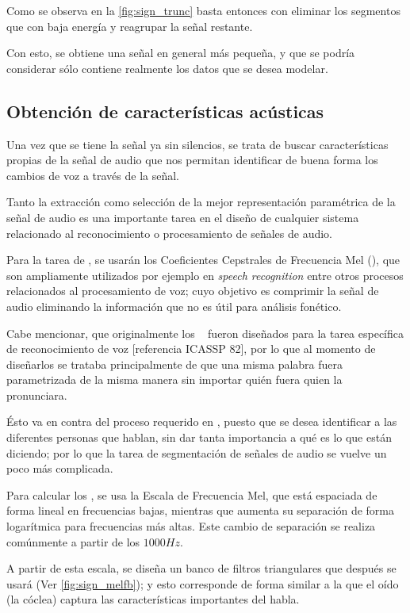 Como se observa en la \autoref{fig:sign_trunc} basta entonces con eliminar los segmentos que con baja energía y reagrupar la señal restante.

Con esto, se obtiene una señal en general más pequeña, y que se podría  considerar sólo contiene realmente los datos que se desea modelar.

\subsection{Obtención de características acústicas}

Una vez que se tiene la señal ya sin silencios, se trata de buscar características propias de la señal de audio que nos permitan identificar de buena forma los cambios de voz a través de la señal.

Tanto la extracción como selección de la mejor representación paramétrica de la señal de audio es una importante tarea en el diseño de cualquier sistema relacionado al reconocimiento o procesamiento de señales de audio. 

Para la tarea de \sd, se usarán los Coeficientes Cepstrales de Frecuencia Mel  (\MFCC), que son ampliamente utilizados por ejemplo en \textit{speech recognition} entre otros procesos relacionados al procesamiento de voz; cuyo objetivo es comprimir la señal de audio eliminando la información que no es útil para análisis fonético.

Cabe mencionar, que originalmente los \MFCC~ fueron diseñados para la tarea específica de reconocimiento de voz [referencia ICASSP 82], por lo que al momento de diseñarlos se trataba principalmente de que una misma palabra fuera parametrizada de la misma manera sin importar quién fuera quien la pronunciara. 

Ésto va en contra del proceso requerido en \sd, puesto que se desea identificar a las diferentes personas que hablan, sin dar tanta importancia a qué es lo que están diciendo; por lo que la tarea de segmentación de señales de audio se vuelve un poco más complicada.

Para calcular los \MFCC, se usa la Escala de Frecuencia Mel, que está espaciada de forma lineal en frecuencias bajas, mientras que aumenta su separación de forma logarítmica para frecuencias más altas. Este cambio de separación se realiza comúnmente a partir de los $1000Hz$. 

A partir de esta escala, se diseña un banco de filtros triangulares que después se usará (Ver \autoref{fig:sign_melfb}); y esto corresponde de forma similar a la que el oído (la cóclea) captura las características importantes del habla. 

